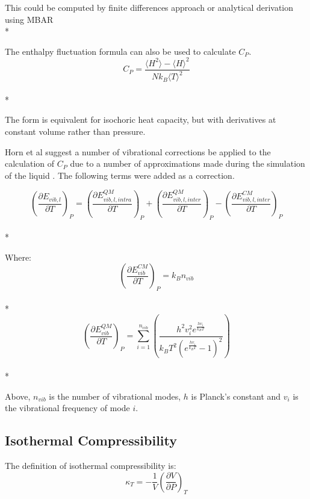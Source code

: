 \documentclass[aps,pre,twocolumn,nofootinbib,superscriptaddress,linenumbers,10pt, draft,tightenlines]{revtex4-1}
\begin{document}
This could be computed by finite differences approach or analytical derivation using MBAR\\*

The enthalpy fluctuation formula can also be used to calculate $C_P$\cite{horn}.
\begin{equation}C_P = \frac{\langle H^2 \rangle - \langle H \rangle^2}{N k_B \langle T \rangle^2}\end{equation}\\*

The form is equivalent for isochoric heat capacity, but with derivatives at constant volume rather than pressure.

Horn et al suggest a number of vibrational corrections be applied to the calculation of $C_P$ due to a number of approximations made during the simulation of the liquid \cite{horn}. The following terms were added as a correction.

\begin{equation}\left(\frac{\partial E_{vib,l}}{\partial T}\right)_{P} = \left(\frac{\partial E_{vib,l,intra}^{QM}}{\partial T}\right)_{P} + \left(\frac{\partial E_{vib,l,inter}^{QM}}{\partial T}\right)_{P} - \left(\frac{\partial E_{vib,l,inter}^{CM}}{\partial T}\right)_{P}\end{equation}\\*

Where:
\begin{equation}\left(\frac{\partial E_{vib}^{CM}}{\partial T}\right)_{P} = k_B n_{vib}\end{equation}\\*
\begin{equation}\left(\frac{\partial E_{vib}^{QM}}{\partial T}\right)_{P} = \sum_{i=1}^{n_{vib}} \left(\frac{h^2 v_{i}^2 e^{\frac{h v_{i}}{k_B T}}}{k_B T^2 \left(e^{\frac{h v_{i}}{k_B T}} - 1\right)^2}\right)\end{equation}\\*

Above, $n_{vib}$ is the number of vibrational modes, $h$ is Planck's constant and $v_i$ is the vibrational frequency of mode $i$.

\subsection{Isothermal Compressibility}
The definition of isothermal compressibility is:
\begin{equation}\kappa_T = -\frac{1}{V} \left(\frac{\partial V}{\partial P}\right)_T \end{equation}
\end{document}
